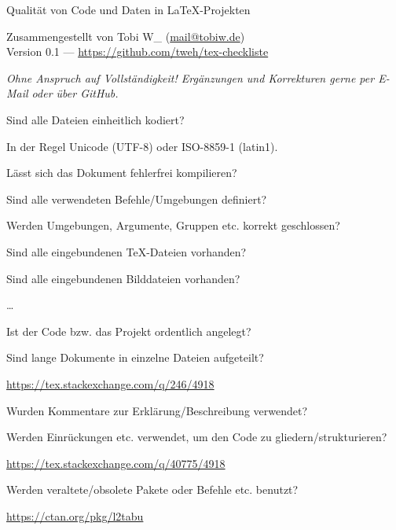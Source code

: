\documentclass[
   ngerman,
   fontsize = 11.5pt,
   parskip = half,
   headings = small,
]{scrartcl}
\let\section\minisec
\newcommand{\hint}[1]{{%
   \par
   \vspace{-\parskip}%
   \footnotesize
   #1
}}
\begin{document}
\RaggedRight

\begin{center}
   \setlength{\parskip}{0pt}
   \bfseries
   
   \smallskip
   \LARGE\color{spot}
   Qualität von Code und Daten in \LaTeX-Projekten
   
   \vspace{\baselineskip}
   \normalsize\mdseries\normalcolor
   Zusammengestellt von Tobi W\_ (\url{mail@tobiw.de})\\
   Version 0.1 --- \url{https://github.com/tweh/tex-checkliste}\\
\end{center}

\vspace{\baselineskip}
{\footnotesize\itshape
   Ohne Anspruch auf Vollständigkeit! Ergänzungen und Korrekturen gerne per
   E-Mail oder über GitHub.
\par}

\vspace{2\baselineskip}
\section{Allgemeines}
\begin{checklist}
   \item Sind alle Dateien einheitlich kodiert?
      \hint{In der Regel Unicode (UTF-8) oder ISO-8859-1 (latin1).}
   \item Lässt sich das Dokument fehlerfrei kompilieren?
   \begin{checklist}
      \item Sind alle verwendeten Befehle/Umgebungen definiert?
      \item Werden Umgebungen, Argumente, Gruppen etc. korrekt geschlossen?
      \item Sind alle eingebundenen \TeX-Dateien vorhanden?
      \item Sind alle eingebundenen Bilddateien vorhanden?
      \item \dots
   \end{checklist}
   \item Ist der Code bzw. das Projekt ordentlich angelegt?
   \begin{checklist}
      \item Sind lange Dokumente in einzelne Dateien aufgeteilt?
         \hint{\url{https://tex.stackexchange.com/q/246/4918}}
      \item Wurden Kommentare zur Erklärung/Beschreibung verwendet?
      \item Werden Einrückungen etc. verwendet, um den Code zu gliedern/strukturieren?
         \hint{\url{https://tex.stackexchange.com/q/40775/4918}}
   \end{checklist}
   \item Werden veraltete/obsolete Pakete oder Befehle etc. benutzt?
      \hint{\url{https://ctan.org/pkg/l2tabu}}
\end{checklist}
\end{document}
